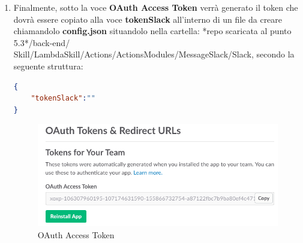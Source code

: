 \documentclass[../ManualeSviluppatore_v2.0.0.tex]{subfiles}
\begin{document}
\begin{enumerate}
				\item Finalmente, sotto la voce \textbf{OAuth Access Token} verrà generato il token che dovrà essere copiato alla voce \textbf{tokenSlack} all'interno di un file da creare chiamandolo \textbf{config.json} situandolo nella cartella: *repo scaricata al punto 5.3*/back-end/ Skill/LambdaSkill/Actions/ActionsModules/MessageSlack/Slack, secondo la seguente struttura:
				\begin{lstlisting}[language=json,firstnumber=1]
{
	"tokenSlack":""
}
				\end{lstlisting}
				\begin{figure}[!h]
					\centering
					\includegraphics[scale=0.54]{Screenshot/OAuth.png}
					\caption{OAuth Access Token}
				\end{figure}
			\end{enumerate}
\end{document}
